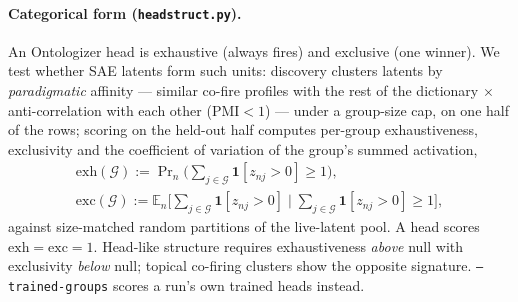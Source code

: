 \paragraph{Categorical form (\texttt{headstruct.py}).}
An Ontologizer head is exhaustive (always fires) and exclusive (one
winner). We test whether SAE latents form such units: discovery clusters
latents by \emph{paradigmatic} affinity --- similar co-fire profiles with
the rest of the dictionary $\times$ anti-correlation with each other
(PMI${}<1$) --- under a group-size cap, on one half of the rows; scoring
on the held-out half computes per-group exhaustiveness, exclusivity and
the coefficient of variation of the group's summed activation,
\begin{equation}
	\begin{gathered}
	\mathrm{exh}(\mathcal{G}) := \Pr\nolimits_n\!\big(\textstyle\sum_{j \in \mathcal{G}} \mathbf{1}[z_{nj} > 0] \ge 1\big),
	\\
	\mathrm{exc}(\mathcal{G}) := \mathbb{E}_n\!\big[\textstyle\sum_{j \in \mathcal{G}} \mathbf{1}[z_{nj} > 0]
	\;\big|\; \textstyle\sum_{j \in \mathcal{G}} \mathbf{1}[z_{nj} > 0] \ge 1\big],
	\end{gathered}
	\label{eq:exhaust}
\end{equation}
against size-matched random partitions of the live-latent pool. A head
scores $\mathrm{exh} = \mathrm{exc} = 1$. Head-like structure requires exhaustiveness \emph{above}
null with exclusivity \emph{below} null; topical co-firing clusters show
the opposite signature. \texttt{--trained-groups} scores a run's own
trained heads instead.

